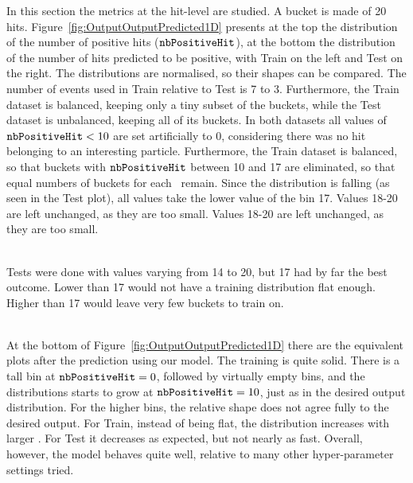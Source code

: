 In this section the metrics at the hit-level are studied. A bucket is made of 20 hits. Figure~\ref{fig:OutputOutputPredicted1D} presents at the top the distribution of the number of positive hits ($\nbPositiveHit$), at the bottom the distribution of the number of hits predicted to be positive, with Train on the left and Test on the right. The distributions are normalised, so their shapes can be compared. The number of events used in Train relative to Test is 7 to 3. Furthermore, the Train dataset is balanced, keeping only a tiny subset of the buckets, while the Test dataset is unbalanced, keeping all of its buckets. In both datasets all values of $\nbPositiveHit < 10$ are set artificially to 0, considering there was no hit belonging to an interesting particle. Furthermore, the Train dataset is balanced, so that buckets with $\nbPositiveHit$ between 10 and 17 are eliminated, so that equal numbers of buckets for each \nbPositiveHit~remain. Since the distribution is falling (as seen in the Test plot), all values take the lower value of the bin 17. Values 18-20 are left unchanged, as they are too small. Values 18-20 are left unchanged, as they are too small.

\ \\Tests were done with values varying from 14 to 20, but 17 had by far the best outcome. Lower than 17 would not have a training distribution flat enough. Higher than 17 would leave very few buckets to train on. 

\ \\At the bottom of Figure~\ref{fig:OutputOutputPredicted1D} there are the equivalent plots after the prediction using our model. The training is quite solid. There is a tall bin at $\nbPositiveHit=0$, followed by virtually empty bins, and the distributions starts to grow at $\nbPositiveHit=10$, just as in the desired output distribution. For the higher bins, the relative shape does not agree fully to the desired output. For Train, instead of being flat, the distribution increases with larger \nbPositiveHit. For Test it decreases as expected, but not nearly as fast. Overall, however, the model behaves quite well, relative to many other hyper-parameter settings tried.



